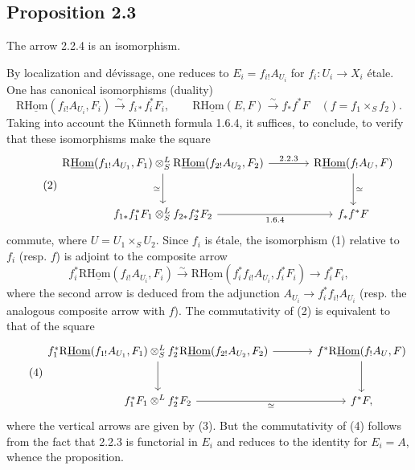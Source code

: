 \documentclass[11pt]{article}
\begin{document}
\subsection*{Proposition 2.3}
The arrow 2.2.4 is an isomorphism.

By localization and dévissage, one reduces to $E_i=f_{i!}A_{U_i}$ for $f_i:U_i\to X_i$ étale. One has canonical isomorphisms (duality)
\begin{equation}\tag{1}
\mathrm{R}\underline{\mathrm{Hom}}(f_{i!}A_{U_i},F_i)\xrightarrow{\sim}f_{i*}f_i^{*}F_i,
\qquad
\mathrm{R}\underline{\mathrm{Hom}}(E,F)\xrightarrow{\sim}f_{*}f^{*}F\quad(f=f_1\times_S f_2).
\end{equation}
Taking into account the Künneth formula 1.6.4, it suffices, to conclude, to verify that these isomorphisms make the square
\begin{equation}\tag{2}
\begin{tikzcd}[column sep=large,row sep=large]
\mathrm{R}\underline{\mathrm{Hom}}(f_{1!}A_{U_1},F_1)\otimes^{L}_{S}\mathrm{R}\underline{\mathrm{Hom}}(f_{2!}A_{U_2},F_2) \arrow[r,"2.2.3"] \arrow[d,"\simeq"'] & \mathrm{R}\underline{\mathrm{Hom}}(f_{!}A_U,F) \arrow[d,"\simeq"]\\
f_{1*}f_1^{*}F_1\otimes^{L}_{S}f_{2*}f_2^{*}F_2 \arrow[r,"1.6.4"'] & f_{*}f^{*}F
\end{tikzcd}
\end{equation}
commute, where $U=U_1\times_SU_2$. Since $f_i$ is étale, the isomorphism (1) relative to $f_i$ (resp. $f$) is adjoint to the composite arrow
\begin{equation}\tag{3}
f_i^{*}\mathrm{R}\underline{\mathrm{Hom}}(f_{i!}A_{U_i},F_i)\xrightarrow{\sim}\mathrm{R}\underline{\mathrm{Hom}}(f_i^{*}f_{i!}A_{U_i},f_i^{*}F_i)\longrightarrow f_i^{*}F_i,
\end{equation}
where the second arrow is deduced from the adjunction $A_{U_i}\to f_i^{*}f_{i!}A_{U_i}$ (resp. the analogous composite arrow with $f$). The commutativity of (2) is equivalent to that of the square
\begin{equation}\tag{4}
\begin{tikzcd}[column sep=large,row sep=large]
f_1^{*}\mathrm{R}\underline{\mathrm{Hom}}(f_{1!}A_{U_1},F_1)\otimes^{L}_{S}f_2^{*}\mathrm{R}\underline{\mathrm{Hom}}(f_{2!}A_{U_2},F_2) \arrow[r] \arrow[d] & f^{*}\mathrm{R}\underline{\mathrm{Hom}}(f_{!}A_U,F) \arrow[d]\\
f_1^{*}F_1\otimes^{L}f_2^{*}F_2 \arrow[r,"\simeq"'] & f^{*}F,
\end{tikzcd}
\end{equation}
where the vertical arrows are given by (3). But the commutativity of (4) follows from the fact that 2.2.3 is functorial in $E_i$ and reduces to the identity for $E_i=A$, whence the proposition.
\end{document}
